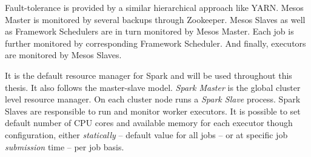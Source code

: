 \begin{description}[leftmargin=0pt]
    Fault-tolerance is provided by a similar hierarchical approach like YARN. Mesos Master is monitored by several backups through Zookeeper. Mesos Slaves as well as Framework Schedulers are in turn monitored by Mesos Master. Each job is further monitored by corresponding Framework Scheduler. And finally, executors are monitored by Mesos Slaves. 
    \item [Spark Standalone] It is the default resource manager for Spark and will be used throughout this thesis. It also follows the master-slave model. \emph{Spark Master} is the global cluster level resource manager. On each cluster node runs a \emph{Spark Slave} process. Spark Slaves are responsible to run and monitor worker executors. It is possible to set default number of CPU cores and available memory for each executor though configuration, either \emph{statically} -- default value for all jobs -- or at specific job \emph{submission} time -- per job basis.
    

\end{description}
